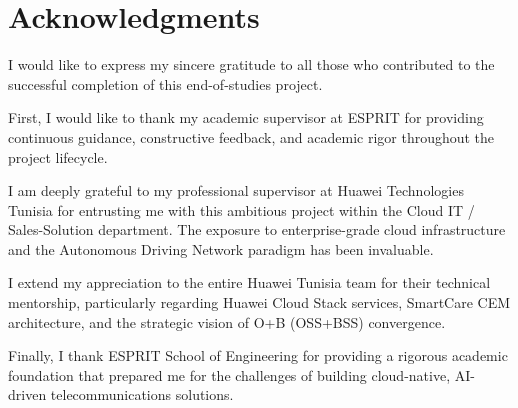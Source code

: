 \chapter*{Acknowledgments}

I would like to express my sincere gratitude to all those who contributed to the successful completion of this end-of-studies project.

First, I would like to thank my academic supervisor at ESPRIT for providing continuous guidance, constructive feedback, and academic rigor throughout the project lifecycle.

I am deeply grateful to my professional supervisor at Huawei Technologies Tunisia for entrusting me with this ambitious project within the Cloud IT / Sales-Solution department. The exposure to enterprise-grade cloud infrastructure and the Autonomous Driving Network paradigm has been invaluable.

I extend my appreciation to the entire Huawei Tunisia team for their technical mentorship, particularly regarding Huawei Cloud Stack services, SmartCare CEM architecture, and the strategic vision of O+B (OSS+BSS) convergence.

Finally, I thank ESPRIT School of Engineering for providing a rigorous academic foundation that prepared me for the challenges of building cloud-native, AI-driven telecommunications solutions.

\newpage
